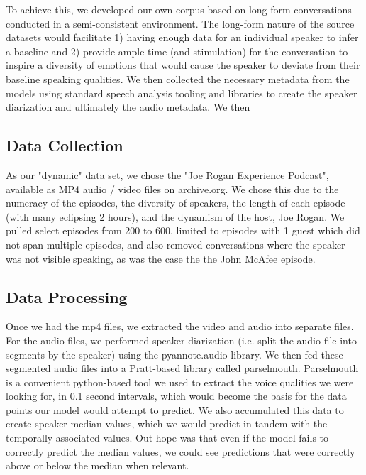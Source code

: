 \documentclass[10pt,twocolumn,letterpaper]{article}
\begin{document}
To achieve this, we developed our own corpus based on long-form conversations conducted in a semi-consistent environment. The long-form nature of the source datasets would facilitate 1) having enough data for an individual speaker to infer a baseline and 2) provide ample time (and stimulation) for the conversation to inspire a diversity of emotions that would cause the speaker to deviate from their baseline speaking qualities. We then collected the necessary metadata from the models using standard speech analysis tooling and libraries to create the speaker diarization and ultimately the audio metadata. We then 

\subsection{Data Collection}

As our "dynamic" data set, we chose the "Joe Rogan Experience Podcast", available as MP4 audio / video files on archive.org. We chose this due to the numeracy of the episodes, the diversity of speakers, the length of each episode (with many eclipsing 2 hours), and the dynamism of the host, Joe Rogan. We pulled select episodes from 200 to 600, limited to episodes with 1 guest which did not span multiple episodes, and also removed conversations where the speaker was not visible speaking, as was the case the the John McAfee episode.

\subsection{Data Processing}

Once we had the mp4 files, we extracted the video and audio into separate files. For the audio files, we performed speaker diarization (i.e. split the audio file into segments by the speaker) using the pyannote.audio library\cite{Bredin23}. We then fed these segmented audio files into a Pratt\cite{Pratt}-based library called parselmouth\cite{Parselmouth}.  Parselmouth is a convenient python-based tool we used to extract the voice qualities we were looking for, in 0.1 second intervals, which would become the basis for the data points our model would attempt to predict. We also accumulated this data to create speaker median values, which we would predict in tandem with the temporally-associated values. Out hope was that even if the model fails to correctly predict the median values, we could see predictions that were correctly above or below the median when relevant. 
\end{document}
